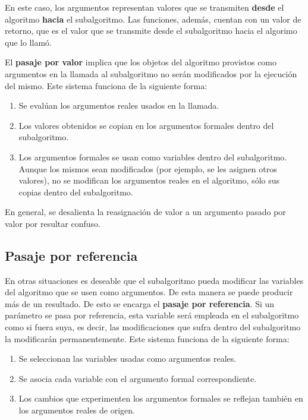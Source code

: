 \documentclass[
]{book}
\providecommand{\tightlist}{%
  \setlength{\itemsep}{0pt}\setlength{\parskip}{0pt}}
\begin{document}
En este caso, los argumentos representan valores que se transmiten \textbf{desde} el algoritmo \textbf{hacia} el subalgoritmo. Las funciones, además, cuentan con un valor de retorno, que es el valor que se transmite desde el subalgoritmo hacia el algorimo que lo llamó.

El \textbf{pasaje por valor} implica que los objetos del algoritmo provistos como argumentos en la llamada al subalgoritmo no serán modificados por la ejecución del mismo. Este sistema funciona de la siguiente forma:

\begin{enumerate}
\def\labelenumi{\arabic{enumi}.}
\tightlist
\item
  Se evalúan los argumentos reales usados en la llamada.
\item
  Los valores obtenidos se copian en los argumentos formales dentro del subalgoritmo.
\item
  Los argumentos formales se usan como variables dentro del subalgoritmo. Aunque los mismos sean modificados (por ejemplo, se les asignen otros valores), no se modifican los argumentos reales en el algoritmo, sólo sus copias dentro del subalgoritmo.
\end{enumerate}

En general, se desalienta la reasignación de valor a un argumento pasado por valor por resultar confuso.

\hypertarget{pasaje-por-referencia}{%
\subsection{Pasaje por referencia}\label{pasaje-por-referencia}}

En otras situaciones es deseable que el subalgoritmo pueda modificar las variables del algoritmo que se usen como argumentos. De esta manera se puede producir más de un resultado. De esto se encarga el \textbf{pasaje por referencia}. Si un parámetro se pasa por referencia, esta variable será empleada en el subalgoritmo como si fuera suya, es decir, las modificaciones que sufra dentro del subalgoritmo la modificarán permanentemente. Este sistema funciona de la siguiente forma:

\begin{enumerate}
\def\labelenumi{\arabic{enumi}.}
\tightlist
\item
  Se seleccionan las variables usadas como argumentos reales.
\item
  Se asocia cada variable con el argumento formal correspondiente.
\item
  Los cambios que experimenten los argumentos formales se reflejan también en los argumentos reales de origen.
\end{enumerate}
\end{document}
